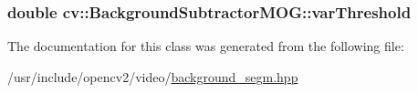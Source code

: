 \hypertarget{classcv_1_1BackgroundSubtractorMOG_a65756e9a252270d5ad906c8a94bc0b7e}{
\subsubsection[{var\-Threshold}]{\setlength{\rightskip}{0pt plus 5cm}double cv\-::\-Background\-Subtractor\-M\-O\-G\-::var\-Threshold\hspace{0.3cm}{\ttfamily [protected]}}}\label{classcv_1_1BackgroundSubtractorMOG_a65756e9a252270d5ad906c8a94bc0b7e}


The documentation for this class was generated from the following file\-:\begin{DoxyCompactItemize}
\item 
/usr/include/opencv2/video/\hyperlink{background__segm_8hpp}{background\-\_\-segm.\-hpp}\end{DoxyCompactItemize}

